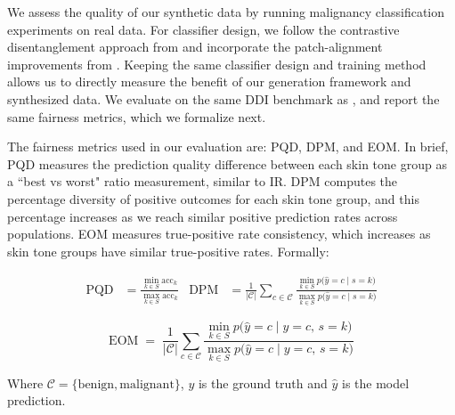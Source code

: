 \documentclass[11pt]{ucthesis}
\begin{document}
\label{cgddi:sec:cls}\label{cgddi:sec:cls_fairness}
We assess the quality of our synthetic data by running malignancy classification experiments on real data. For classifier design, we follow the contrastive disentanglement approach from \cite{du_2023_fairdisco} and incorporate the patch-alignment improvements from \cite{aayushman-2024}. Keeping the same classifier design and training method allows us to directly measure the benefit of our generation framework and synthesized data. We evaluate on the same DDI benchmark as \cite{du_2023_fairdisco, aayushman-2024}, and report the same fairness metrics, which we formalize next.




The fairness metrics used in our evaluation are: PQD, DPM, and EOM. In brief, PQD measures the prediction quality difference between each skin tone group as a ``best vs worst" ratio measurement, similar to IR. DPM computes the percentage diversity of positive outcomes for each skin tone group, and this percentage increases as we reach similar positive prediction rates across populations. EOM measures true-positive rate consistency, which increases as skin tone groups have similar true-positive rates. Formally:

\noindent
\begin{align}
\mathrm{PQD} &= \frac{\min_{k\in S}\mathrm{acc}_k}{\max_{k\in S}\mathrm{acc}_k} & 
\mathrm{DPM} &= \frac{1}{|\mathcal{C}|}\sum_{c\in\mathcal{C}}\frac{\min_{k\in S}p\bigl(\hat y = c \mid s=k\bigr)}{\max_{k\in S}p\bigl(\hat y = c \mid s=k\bigr)}
\end{align}

\noindent
\begin{equation}
\mathrm{EOM}
\;=\;
\frac{1}{|\mathcal{C}|}
\sum_{c\in\mathcal{C}}
\frac{\min_{k\in S}p\bigl(\hat y = c \mid y=c,\,s=k\bigr)}
     {\max_{k\in S}p\bigl(\hat y = c \mid y=c,\,s=k\bigr)}
\end{equation}

Where $\mathcal{C} = \{\mathrm{benign},\mathrm{malignant}\}$, $y$ is the ground truth and $\hat{y}$ is the model prediction.
\end{document}
